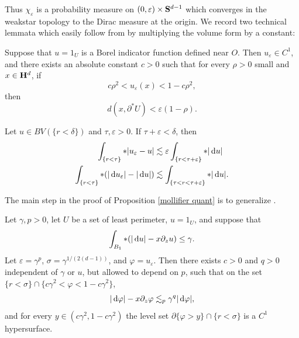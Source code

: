Thus $\chi_\varepsilon$ is a probability measure on $(0, \varepsilon) \times \mathbf S^{d - 1}$ which converges in the weakstar topology to the Dirac measure at the origin.
We record two technical lemmata which easily follow from \cite[Lemmata 7.1--7.2]{Giusti77} by multiplying the volume form by a constant:

\begin{lemma}\label{Giusti71}
Suppose that $u = 1_U$ is a Borel indicator function defined near $O$. Then $u_\varepsilon \in C^1$, and there exists an absolute constant $c > 0$ such that for every $\rho > 0$ small and $x \in \mathbf H^d$, if
$$c\rho^2 < u_\varepsilon(x) < 1 - c\rho^2,$$
then
\begin{equation}\label{Giusti71 claim}
d(x, \partial^* U) < \varepsilon(1 - \rho).
\end{equation}
\end{lemma}

\begin{lemma}\label{Giusti72}
Let $u \in BV(\{r < \delta\})$ and $\tau, \varepsilon > 0$. If $\tau + \varepsilon < \delta$, then
\begin{align*}
\int_{\{r < \tau\}} *|u_\varepsilon - u| &\lesssim \varepsilon \int_{\{r < \tau + \varepsilon\}} *|\mathop{}\!\mathrm{d} u|\\
\int_{\{r < \tau\}} *(|\mathop{}\!\mathrm{d} u_\varepsilon| - |\mathop{}\!\mathrm{d} u|) &\lesssim \int_{\{\tau < r < \tau + \varepsilon\}} *|\mathop{}\!\mathrm{d} u|.
\end{align*}
\end{lemma}

The main step in the proof of Proposition \ref{mollifier quant} is to generalize \cite[Theorem 7.3, Remark 7.4]{Giusti77}.

\begin{lemma}\label{main mollifier lemma}
Let $\gamma, p > 0$, let $U$ be a set of least perimeter, $u = 1_U$, and suppose that
\begin{equation}\label{hypothesis on main mollifier lemma}
\int_{B_1} *(|\mathop{}\!\mathrm{d} u| - x\partial_z u) \leq \gamma.
\end{equation}
Let $\varepsilon = \gamma^p$, $\sigma = \gamma^{1/(2(d - 1))}$, and $\varphi = u_\varepsilon$. Then there exists $c > 0$ and $q > 0$ independent of $\gamma$ or $u$, but allowed to depend on $p$, such that on the set $\{r < \sigma\} \cap \{c\gamma^2 < \varphi < 1 - c\gamma^2\}$,
\begin{equation}\label{claim on main mollifier lemma}
|\mathop{}\!\mathrm{d} \varphi| - x\partial_z \varphi \lesssim_p \gamma^q |\mathop{}\!\mathrm{d} \varphi|,
\end{equation}
and for every $y \in (c\gamma^2, 1 - c\gamma^2)$ the level set $\partial \{\varphi > y\} \cap \{r < \sigma\}$ is a $C^1$ hypersurface.
\end{lemma}

